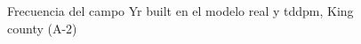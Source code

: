 \begin{figure}[H]
    \centering
    
    \caption{Frecuencia del campo Yr built en el modelo real y tddpm, King county (A-2)}
    \label{frecuency-tddpm-yr built}
\end{figure}